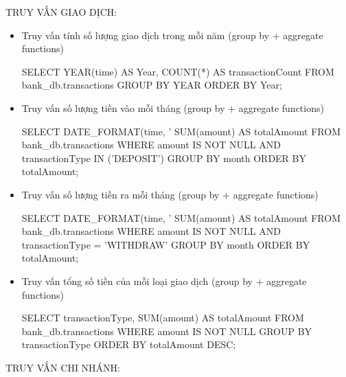 TRUY VẤN GIAO DỊCH:
\begin{itemize}

    \item Truy vấn tính số lượng giao dịch trong mỗi năm (group by + aggregate functions)
    \begin{MySQLCode}
    SELECT 
        YEAR(time) AS Year,
        COUNT(*) AS transactionCount
    FROM 
        bank_db.transactions
    GROUP BY 
        YEAR
    ORDER BY 
        Year;
    \end{MySQLCode}

    \item Truy vấn số lượng tiền vào mỗi tháng (group by + aggregate functions)
    \begin{MySQLCode}
    SELECT 
        DATE_FORMAT(time, '%
        SUM(amount) AS totalAmount
    FROM 
        bank_db.transactions
    WHERE 
        amount IS NOT NULL
        AND transactionType IN ('DEPOSIT')
    GROUP BY 
        month
    ORDER BY 
        totalAmount;
    \end{MySQLCode}
    
    \item Truy vấn số lượng tiền ra mỗi tháng (group by + aggregate functions)
    \begin{MySQLCode}
    SELECT 
        DATE_FORMAT(time, '%
        SUM(amount) AS totalAmount
    FROM 
        bank_db.transactions
    WHERE 
        amount IS NOT NULL
        AND transactionType = 'WITHDRAW'
    GROUP BY 
        month
    ORDER BY 
        totalAmount;
    \end{MySQLCode}

    \item Truy vấn tổng số tiền của mỗi loại giao dịch (group by + aggregate functions)
    \begin{MySQLCode}
    SELECT 
        transactionType, 
        SUM(amount) AS totalAmount
    FROM 
        bank_db.transactions
    WHERE 
        amount IS NOT NULL
    GROUP BY 
        transactionType
    ORDER BY 
        totalAmount DESC;
    \end{MySQLCode}

\end{itemize}
TRUY VẤN CHI NHÁNH:
